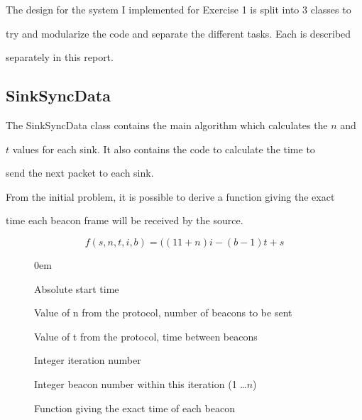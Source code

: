 \documentclass[a4paper,12pt,DIV=calc]{scrartcl}
\begin{document}
The design for the system I implemented for Exercise 1 is split into 3 classes to

try and modularize the code and separate the different tasks. Each is described

separately in this report.



\subsection{SinkSyncData}

The SinkSyncData class contains the main algorithm which calculates the $n$ and

$t$ values for each sink. It also contains the code to calculate the time to

send the next packet to each sink.



From the initial problem, it is possible to derive a function giving the exact

time each beacon frame will be received by the source.



\begin{figure}[ht]

  \begin{mdframed}

  \centering

    \begin{equation*}

      f(s, n, t, i, b) = ((11 + n)i - (b - 1)t + s

    \end{equation*}

    \begin{description}

      \itemsep0em

      \item[$s$] Absolute start time

      \item[$n$] Value of n from the protocol, number of beacons to be sent

      \item[$t$] Value of t from the protocol, time between beacons

      \item[$i$] Integer iteration number

      \item[$b$] Integer beacon number within this iteration (1 \dots $n$)

    \end{description}

  \end{mdframed}

  \caption{Function giving the exact time of each beacon}

\end{figure}
\end{document}
